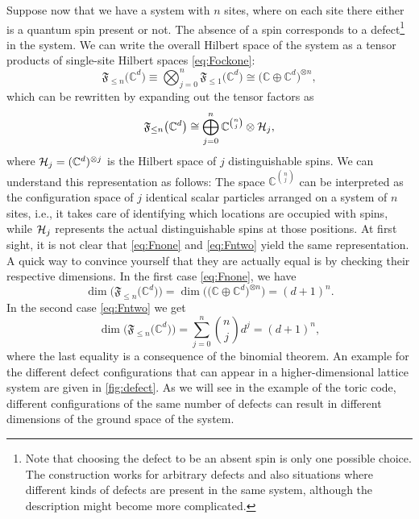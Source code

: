 Suppose now that we have a system with $n$ sites, where on each site there either is a quantum spin present or not. The absence of a spin corresponds to a defect\footnote{Note that choosing the defect to be an absent spin is only one possible choice. The construction works for arbitrary defects and also situations where different kinds of defects are present in the same system, although the description might become more complicated.} in the system. We can write the overall Hilbert space of the system as a tensor products of single-site Hilbert spaces \cref{eq:Fockone}:
\begin{equation}
\label{eq:Fnone}
\mathfrak{F}_{\le n}\big(\mathbb{C}^d\big)\equiv\bigotimes_{j=0}^n\mathfrak{F}_{\le 1}\big(\mathbb{C}^d\big)\cong\big(\mathbb{C}\oplus\mathbb{C}^d\big)^{\otimes n},
\end{equation}
which can be rewritten by expanding out the tensor factors as
\begin{equation}
\label{eq:Fntwo}
\mathfrak{F}_{\le n}\big(\mathbb{C}^d\big)\cong\bigoplus_{j=0}^n\mathbb{C}^{\binom{n}{j}}\otimes{\mathcal{H}}_j,
\end{equation}
where ${\mathcal{H}}_j=(\mathbb{C}^d)^{\otimes j}$ is the Hilbert space of $j$ distinguishable spins. We can understand this representation as follows: The space $\mathbb{C}^{\binom{n}{j}}$ can be interpreted as the configuration space of $j$ identical scalar particles arranged on a system of $n$ sites, i.e., it takes care of identifying which locations are occupied with spins, while ${\mathcal{H}}_j$ represents the actual distinguishable spins at those positions. At first sight, it is not clear that \cref{eq:Fnone} and \cref{eq:Fntwo} yield the same representation. A quick way to convince yourself that they are actually equal is by checking their respective dimensions. In the first case \cref{eq:Fnone}, we have
\begin{equation}
\dim\Big(\mathfrak{F}_{\le n}\big(\mathbb{C}^d\big)\Big)=\dim\Big(\big(\mathbb{C}\oplus\mathbb{C}^d\big)^{\otimes n}\Big)=(d+1)^n.
\end{equation}
In the second case \cref{eq:Fntwo} we get
\begin{equation}
\dim\Big(\mathfrak{F}_{\le n}\big(\mathbb{C}^d\big)\Big)=\sum_{j=0}^n\binom{n}{j}d^j=(d+1)^n,
\end{equation}
where the last equality is a consequence of the binomial theorem. An example for the different defect configurations that can appear in a higher-dimensional lattice system are given in \cref{fig:defect}. As we will see in the example of the toric code, different configurations of the same number of defects can result in different dimensions of the ground space of the system.

